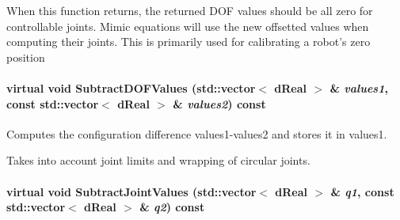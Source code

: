 When this function returns, the returned DOF values should be all zero for controllable joints. Mimic equations will use the new offsetted values when computing their joints. This is primarily used for calibrating a robot's zero position \hypertarget{classOpenRAVE_1_1KinBody_a7c60c9dfe8ef533913967e60f3d7db8f}{
\paragraph[{SubtractDOFValues}]{\setlength{\rightskip}{0pt plus 5cm}virtual void SubtractDOFValues (std::vector$<$ dReal $>$ \& {\em values1}, \/  const std::vector$<$ dReal $>$ \& {\em values2}) const}\hfill}
\label{classOpenRAVE_1_1KinBody_a7c60c9dfe8ef533913967e60f3d7db8f}


Computes the configuration difference values1-\/values2 and stores it in values1. 

Takes into account joint limits and wrapping of circular joints. \hypertarget{classOpenRAVE_1_1KinBody_a4b35aa1ab1b6538d151f7f6cb254c5fe}{
\paragraph[{SubtractJointValues}]{\setlength{\rightskip}{0pt plus 5cm}virtual void SubtractJointValues (std::vector$<$ dReal $>$ \& {\em q1}, \/  const std::vector$<$ dReal $>$ \& {\em q2}) const}\hfill}
\label{classOpenRAVE_1_1KinBody_a4b35aa1ab1b6538d151f7f6cb254c5fe}


